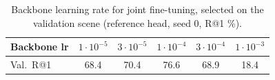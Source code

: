 \begin{table}[t]
\centering
\caption{Backbone learning rate for joint fine-tuning, selected on the validation scene (reference head, seed 0, R@1 \%).}
\label{tab:lrsweep}
\footnotesize
\begin{tabular}{@{}lccccc@{}}
\toprule
Backbone lr & $1\cdot10^{-5}$ & $3\cdot10^{-5}$ & $1\cdot10^{-4}$ & $3\cdot10^{-4}$ & $1\cdot10^{-3}$ \\
\midrule
Val.\ R@1 & 68.4 & 70.4 & 76.6 & 68.9 & 18.4 \\
\bottomrule
\end{tabular}
\end{table}
